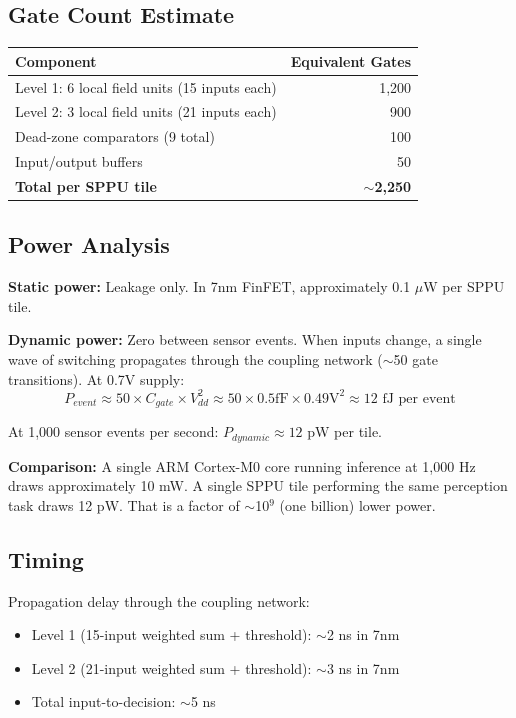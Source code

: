 \documentclass[11pt, a4paper]{article}
\begin{document}
\subsection{Gate Count Estimate}

\begin{center}
\begin{tabular}{@{}lr@{}}
\toprule
\textbf{Component} & \textbf{Equivalent Gates} \\
\midrule
Level 1: 6 local field units (15 inputs each) & 1,200 \\
Level 2: 3 local field units (21 inputs each) & 900 \\
Dead-zone comparators (9 total) & 100 \\
Input/output buffers & 50 \\
\midrule
\textbf{Total per SPPU tile} & \textbf{$\sim$2,250} \\
\bottomrule
\end{tabular}
\end{center}

\subsection{Power Analysis}

\textbf{Static power:} Leakage only. In 7nm FinFET, approximately
0.1 $\mu$W per SPPU tile.

\textbf{Dynamic power:} Zero between sensor events. When inputs
change, a single wave of switching propagates through the coupling
network ($\sim$50 gate transitions). At 0.7V supply:
\begin{equation}
  P_{event} \approx 50 \times C_{gate} \times V_{dd}^2 \approx 50 \times 0.5\text{fF} \times 0.49\text{V}^2 \approx 12\text{ fJ per event}
\end{equation}

At 1,000 sensor events per second: $P_{dynamic} \approx 12$ pW per tile.

\textbf{Comparison:} A single ARM Cortex-M0 core running inference at
1,000 Hz draws approximately 10 mW. A single SPPU tile performing
the same perception task draws 12 pW. That is a factor of
$\sim$10$^{9}$ (one billion) lower power.

\subsection{Timing}

Propagation delay through the coupling network:
\begin{itemize}[nosep]
  \item Level 1 (15-input weighted sum + threshold): $\sim$2 ns in 7nm
  \item Level 2 (21-input weighted sum + threshold): $\sim$3 ns in 7nm
  \item Total input-to-decision: $\sim$5 ns
\end{itemize}
\end{document}
